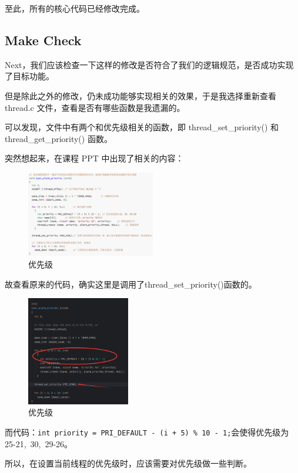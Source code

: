 至此，所有的核心代码已经修改完成。

\subsection{Make Check}

Next，我们应该检查一下这样的修改是否符合了我们的逻辑规范，是否成功实现了目标功能。

但是除此之外的修改，仍未成功能够实现相关的效果，于是我选择重新查看 thread.c 文件，查看是否有哪些函数是我遗漏的。

可以发现，文件中有两个和优先级相关的函数，即 thread\_set\_priority() 和 thread\_get\_priority() 函数。

突然想起来，在课程 PPT 中出现了相关的内容：

\begin{figure} [H]
    \centering
    \includegraphics[width=0.5\textwidth]{img3/PPT.png}
    \caption{优先级}
    \label{fig:priority}
\end{figure}

故查看原来的代码，确实这里是调用了thread\_set\_priority()函数的。

\begin{figure} [H]
    \centering
    \includegraphics[width=0.4\textwidth]{img3/order.png}
    \caption{优先级}
\end{figure}

而代码：\texttt{int priority = PRI\_DEFAULT - (i + 5) \% 10 - 1;}会使得优先级为 25-21,\ 30,\ 29-26。

所以，在设置当前线程的优先级时，应该需要对优先级做一些判断。

